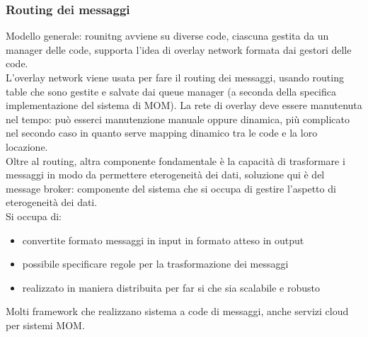 \documentclass{article}
\begin{document}
\subsubsection{Routing dei messaggi}
Modello generale: rounitng avviene su diverse code, ciascuna gestita da un manager delle code, supporta l'idea di overlay network formata dai gestori delle code.\\ L'overlay network viene usata per fare il routing dei messaggi, usando routing table che sono gestite e salvate dai queue manager (a seconda della specifica implementazione del sistema di MOM). La rete di overlay deve essere manutenuta nel tempo: può esserci manutenzione manuale oppure dinamica, più complicato nel secondo caso in quanto serve mapping dinamico tra le code e la loro locazione.\\ Oltre al routing, altra componente fondamentale è la capacità di trasformare i messaggi in modo da permettere eterogeneità dei dati, soluzione qui è del message broker: componente del sistema che si occupa di gestire l'aspetto di eterogeneità dei dati.\\ Si occupa di:
\begin{itemize}
\item convertite formato messaggi in input in formato atteso in output
\item possibile specificare regole per la trasformazione dei messaggi
\item realizzato in maniera distribuita per far si che sia scalabile e robusto
\end{itemize}
Molti framework che realizzano sistema a code di messaggi, anche servizi cloud per sistemi MOM.
\end{document}
